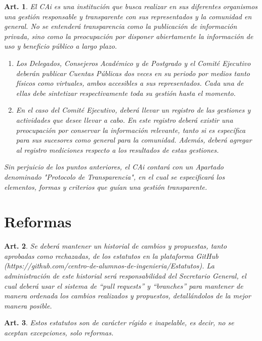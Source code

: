 \documentclass[letterpaper,11pt]{article}
\theoremstyle{plain}
\newtheorem{art}{Art.} %
\begin{document}
			\begin{art}\label{definicionProtocoloTransparencia}
				El CAi es una institución que busca realizar en sus diferentes organismos una gestión responsable y transparente con sus representados y la comunidad en general. No se entenderá transparencia como la publicación de información privada, sino como la preocupación por disponer abiertamente la información de uso y beneficio público a largo plazo.
				\begin{enumerate}
					\item Los Delegados, Consejeros Académico y de Postgrado y el Comité Ejecutivo deberán publicar Cuentas Públicas dos veces en su periodo por medios tanto físicos como virtuales, ambos accesibles a sus representados. Cada una de ellas debe sintetizar respectivamente toda su gestión hasta el momento.
					\item En el caso del Comité Ejecutivo, deberá llevar un registro de las gestiones y actividades que desee llevar a cabo. En este registro deberá existir una preocupación por conservar la información relevante, tanto si es específica para sus sucesores como general para la comunidad. Además, deberá agregar al registro mediciones respecto a los resultados de estas gestiones.
				\end{enumerate}
				Sin perjuicio de los puntos anteriores, el CAi contará con un Apartado denominado "Protocolo de Transparencia", en el cual se especificará los elementos, formas y criterios que guían una gestión transparente.
			\end{art}

	\section{Reformas}\label{reformas}

		\begin{art}
			Se deberá mantener un historial de cambios y propuestas, tanto aprobadas como rechazadas, de los estatutos en la plataforma GitHub (https://github.com/centro-de-alumnos-de-ingenieria/Estatutos). La administración de este historial será responsabilidad del Secretario General, el cual deberá usar el sistema de “pull requests” y “branches” para mantener de manera ordenada los cambios realizados y propuestos, detallándolos de la mejor manera posible.
		\end{art}

		\begin{art}
			Estos estatutos son de carácter rígido e inapelable, es decir, no se aceptan excepciones, solo reformas.
		\end{art}
\end{document}
